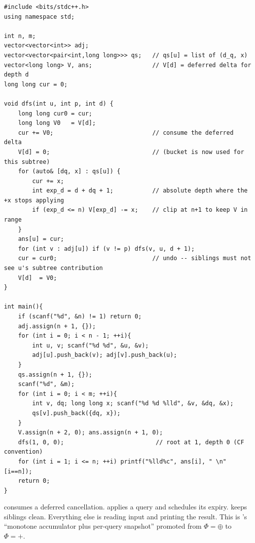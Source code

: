 \begin{lstlisting}[caption={Vasya and a Tree -- per-depth lazy difference on a fixed-root DFS, snapshot-and-undo; long long throughout (Codeforces 1076E; O(n + m))}, label={lst:c10-summit}]
#include <bits/stdc++.h>
using namespace std;

int n, m;
vector<vector<int>> adj;
vector<vector<pair<int,long long>>> qs;   // qs[u] = list of (d_q, x)
vector<long long> V, ans;                 // V[d] = deferred delta for depth d
long long cur = 0;

void dfs(int u, int p, int d) {
    long long cur0 = cur;
    long long V0   = V[d];
    cur += V0;                            // consume the deferred delta
    V[d] = 0;                             // (bucket is now used for this subtree)
    for (auto& [dq, x] : qs[u]) {
        cur += x;
        int exp_d = d + dq + 1;           // absolute depth where the +x stops applying
        if (exp_d <= n) V[exp_d] -= x;    // clip at n+1 to keep V in range
    }
    ans[u] = cur;
    for (int v : adj[u]) if (v != p) dfs(v, u, d + 1);
    cur = cur0;                           // undo -- siblings must not see u's subtree contribution
    V[d]  = V0;
}

int main(){
    if (scanf("%d", &n) != 1) return 0;
    adj.assign(n + 1, {});
    for (int i = 0; i < n - 1; ++i){
        int u, v; scanf("%d %d", &u, &v);
        adj[u].push_back(v); adj[v].push_back(u);
    }
    qs.assign(n + 1, {});
    scanf("%d", &m);
    for (int i = 0; i < m; ++i){
        int v, dq; long long x; scanf("%d %d %lld", &v, &dq, &x);
        qs[v].push_back({dq, x});
    }
    V.assign(n + 2, 0); ans.assign(n + 1, 0);
    dfs(1, 0, 0);                          // root at 1, depth 0 (CF convention)
    for (int i = 1; i <= n; ++i) printf("%lld%c", ans[i], " \n"[i==n]);
    return 0;
}
\end{lstlisting}
\begin{notebox}
 consumes a deferred cancellation.
 applies a query and schedules its
expiry.  keeps siblings clean. Everything
else is reading input and printing the result. This is
's ``monotone accumulator plus per-query
snapshot'' promoted from $\Phi=\oplus$ to $\Phi=+$.
\end{notebox}

